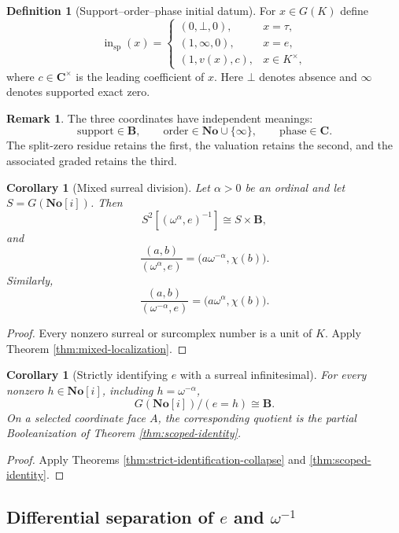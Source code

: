 \documentclass[11pt]{amsart}
\numberwithin{equation}{section}
\newtheorem{corollary}[theorem]{Corollary}
\theoremstyle{definition}
\newtheorem{definition}[theorem]{Definition}
\newtheorem{remark}[theorem]{Remark}
\newcommand{\B}{\mathbf B}
\newcommand{\C}{\mathbf C}
\newcommand{\No}{\mathbf{No}}
\begin{document}
\begin{definition}[Support--order--phase initial datum]\label{def:support-order-phase}
For $x\in G(K)$ define
\[
\operatorname{in}_{\mathrm{sp}}(x)
=
\begin{cases}
(0,\bot,0),&x=\tau,\\
(1,\infty,0),&x=e,\\
(1,v(x),c),&x\in K^\times,
\end{cases}
\]
where $c\in\C^\times$ is the leading coefficient of $x$.  Here $\bot$ denotes absence and $\infty$ denotes supported exact zero.
\end{definition}

\begin{remark}
The three coordinates have independent meanings:
\[
\text{support}\in\B,
\qquad
\text{order}\in\No\cup\{\infty\},
\qquad
\text{phase}\in\C.
\]
The split-zero residue retains the first, the valuation retains the second, and the associated graded retains the third.
\end{remark}

\begin{corollary}[Mixed surreal division]\label{cor:mixed-surreal-division}
Let $\alpha>0$ be an ordinal and let $S=G(\No[i])$.  Then
\[
S^2[(\omega^\alpha,e)^{-1}]
\cong
S\times\B,
\]
and
\[
\frac{(a,b)}{(\omega^\alpha,e)}
=
\bigl(a\omega^{-\alpha},\chi(b)\bigr).
\]
Similarly,
\[
\frac{(a,b)}{(\omega^{-\alpha},e)}
=
\bigl(a\omega^{\alpha},\chi(b)\bigr).
\]
\end{corollary}

\begin{proof}
Every nonzero surreal or surcomplex number is a unit of $K$.  Apply Theorem \ref{thm:mixed-localization}.
\end{proof}

\begin{corollary}[Strictly identifying $e$ with a surreal infinitesimal]
For every nonzero $h\in\No[i]$, including $h=\omega^{-\alpha}$,
\[
G(\No[i])/(e=h)\cong\B.
\]
On a selected coordinate face $A$, the corresponding quotient is the partial Booleanization of Theorem \ref{thm:scoped-identity}.
\end{corollary}

\begin{proof}
Apply Theorems \ref{thm:strict-identification-collapse} and \ref{thm:scoped-identity}.
\end{proof}

\subsection{Differential separation of \texorpdfstring{$e$ and $\omega^{-1}$}{e and omega inverse}}
\end{document}
